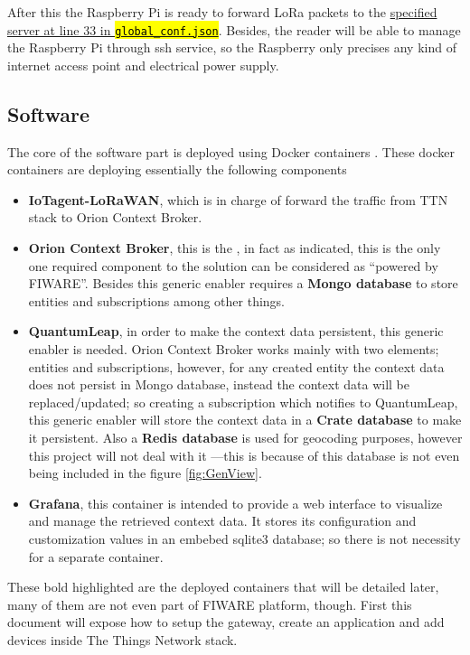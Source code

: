 \documentclass[11pt,a4paper,dvipsnames,twoside]{article}
\newcommand{\myuline}[1]{%
  \uline{\phantom{#1}}%
  \llap{\contour{white}{#1}}%
}
\newcommand{\cmd}[1] {\hl{\texttt{#1}}}
\begin{document}
After this the Raspberry Pi is ready to forward LoRa packets to the \href{https://github.com/dragino/dual_chan_pkt_fwd/blob/master/global_conf.json#L33}{specified server at line 33 in \cmd{global\_conf.json}}. Besides, the reader will be able to manage the Raspberry Pi through ssh service, so the Raspberry only precises any kind of internet access point and electrical power supply.

\subsection{Software}

The core of the software part is deployed using Docker containers \cite{Docker_container}. These docker containers are deploying essentially the following components

\begin{itemize}
  \item \textbf{IoTagent-LoRaWAN}, which is in charge of forward the traffic from TTN stack to Orion Context Broker.
  \item \textbf{Orion Context Broker}, this is the \myuline{core generic enabler}, in fact as indicated, this is the only one required component to the solution can be considered as \enquote{powered by FIWARE}. Besides this generic enabler requires a \textbf{Mongo database} to store entities and subscriptions among other things. 
  \item \textbf{QuantumLeap}, in order to make the context data persistent, this generic enabler is needed. Orion Context Broker works mainly with two elements; entities and subscriptions, however, for any created entity the context data does not persist in Mongo database, instead the context data will be replaced/updated; so creating a subscription which notifies to QuantumLeap, this generic enabler will store the context data in a \textbf{Crate database} to make it persistent. Also a \textbf{Redis database} is used for geocoding purposes, however this project will not deal with it ---this is because of this database is not even being included in the figure \ref{fig:GenView}.
  \item \textbf{Grafana}, this container is intended to provide a web interface to visualize and manage the retrieved context data. It stores its configuration and customization values in an embebed sqlite3 database; so there is not necessity for a separate container. 
\end{itemize}

These bold highlighted are the deployed containers that will be detailed later, many of them are not even part of FIWARE platform, though. First this document will expose how to setup the gateway, create an application and add devices inside The Things Network stack. 
\end{document}
